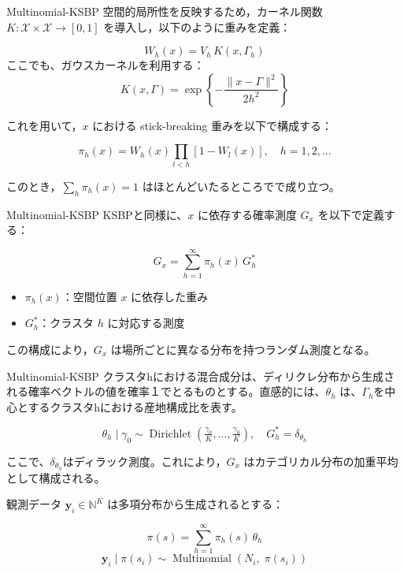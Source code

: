 \documentclass[xelatex, 8pt]{beamer}
\theoremstyle{plain}
\theoremstyle{definition}
\begin{document}
\begin{frame}{Multinomial-KSBP}
空間的局所性を反映するため，カーネル関数 $K:\mathcal X\times\mathcal X\to[0,1]$ を導入し，以下のように重みを定義：

\[
W_h(x) = V_h\,K(x,\Gamma_h)
\]
ここでも、ガウスカーネルを利用する：
\[
K(x,\Gamma) = \exp\!\left\{-\frac{\|x - \Gamma\|^2}{2h^2}\right\}
\]

\vspace{1em}
これを用いて，$x$ における stick-breaking 重みを以下で構成する：

\[
\pi_h(x) = W_h(x)\prod_{l < h}[1 - W_l(x)], \quad h=1,2,\dots
\]

\vspace{0.5em}
このとき，$\sum_h \pi_h(x) = 1$ はほとんどいたるところでで成り立つ。
\end{frame}

\begin{frame}{Multinomial-KSBP}
KSBPと同様に、$x$ に依存する確率測度 $G_x$ を以下で定義する：

\[
G_x = \sum_{h=1}^{\infty} \pi_h(x)\,G_h^*
\]

\begin{itemize}
  \item $\pi_h(x)$：空間位置 $x$ に依存した重み
  \item $G_h^*$：クラスタ $h$ に対応する測度
\end{itemize}

\vspace{1em}
この構成により，$G_x$ は場所ごとに異なる分布を持つランダム測度となる。
\end{frame}

\begin{frame}{Multinomial-KSBP}
クラスタhにおける混合成分は、ディリクレ分布から生成される確率ベクトルの値を確率１でとるものとする。直感的には、$\theta_h$ は、$\Gamma_h$を中心とするクラスタhにおける産地構成比を表す。

\[
\theta_h \mid \gamma_0 \sim
\operatorname{Dirichlet}\left(\tfrac{\gamma_0}{K},\dots,\tfrac{\gamma_0}{K}\right),
\quad
G_h^* = \delta_{\theta_h}
\]

\vspace{0.5em}
ここで、$\delta_{\theta_h}$はディラック測度。これにより，$G_x$ はカテゴリカル分布の加重平均として構成される。

観測データ $\mathbf{y}_i \in \mathbb{N}^K$ は多項分布から生成されるとする：

\[
\pi(s) = \sum_{h=1}^{\infty} \pi_h(s)\,\theta_h
\]
\[
\mathbf{y}_i \mid \pi(s_i) \sim \operatorname{Multinomial}(N_i,\; \pi(s_i))
\]

\end{frame}
\end{document}
